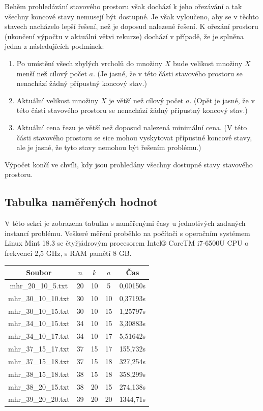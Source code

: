 \documentclass{article}
\begin{document}
Behěm prohledávání stavového prostoru však dochází k jeho ořezávání a tak všechny koncové stavy nemusejí být dostupné. Je však vyloučeno, aby se v těchto stavech nacházelo lepší řešení, než je doposud nalezené řešení. K ořezání prostoru (ukončení výpočtu v aktuální větvi rekurze) dochází v případě, že je splněna jedna z následujících podmínek:
\begin{enumerate}
    \item Po umístění všech zbylých vrcholů do množiny $X$ bude velikost množiny $X$ menší než cílový počet $a$. (Je jasné, že v této části stavového prostoru se nenachází žádný přípustný koncový stav.)
    \item Aktuální velikost množiny $X$ je větší než cílový počet $a$. (Opět je jasné, že v této části stavového prostoru se nenachází žádný přípustný koncový stav.)
    \item Aktuální cena řezu je větší než doposud nalezená minimální cena. (V této části stavového prostoru se sice mohou vyskytovat přípustné koncové stavy, ale je jasné, že tyto stavy nemohou být řešením problému.)
\end{enumerate}

Výpočet končí ve chvíli, kdy jsou prohledány všechny dostupné stavy stavového prostoru.

\subsection{Tabulka naměřených hodnot}
V této sekci je zobrazena tabulka s naměřenými časy u jednotivých zadaných instancí problému. Veškeré měření proběhlo na počítači s operačním systémem Linux Mint 18.3 se čtyřjádrovým procesorem Intel® CoreTM i7-6500U CPU o frekvenci 2,5 GHz, s RAM pamětí 8 GB.

\begin{table}[H]\centering
    \begin{tabular}{|c|c|c|c|c|}
        \hline \textbf{Soubor} & $n$ & $k$  & $a$ & \textbf{Čas} \\ \hline \hline
    	mhr\_20\_10\_5.txt & 20 & 10 & 5 & 0,00150s \\  \hline
    	mhr\_30\_10\_10.txt & 30 & 10 & 10 & 0,37193s \\  \hline
    	mhr\_30\_10\_15.txt & 30 & 10 & 15 & 1,25797s \\  \hline
    	mhr\_34\_10\_15.txt & 34 & 10 & 15 & 3,30883s \\  \hline
    	mhr\_34\_10\_17.txt & 34 & 10 & 17 & 5,51642s \\  \hline
    	mhr\_37\_15\_17.txt & 37 & 15 & 17 & 155,732s \\  \hline
    	mhr\_37\_15\_18.txt & 37 & 15 & 18 & 327,254s \\  \hline
    	mhr\_38\_15\_18.txt & 38 & 15 & 18 & 358,299s \\  \hline
    	mhr\_38\_20\_15.txt & 38 & 20 & 15 & 274,138s \\  \hline
    	mhr\_39\_20\_20.txt & 39 & 20 & 20 & 1344,71s \\  \hline
    \end{tabular}
\end{table} 
\end{document}
